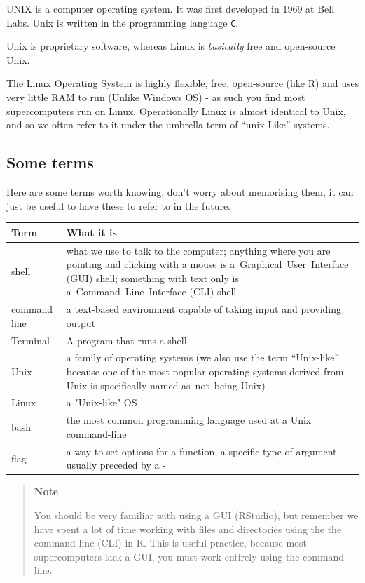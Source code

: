 \documentclass[
]{book}
\begin{document}
UNIX is a computer operating system. It was first developed in 1969 at Bell Labs. Unix is written in the programming language \texttt{C}.

Unix is proprietary software, whereas Linux is \emph{basically} free and open-source Unix.

The Linux Operating System is highly flexible, free, open-source (like R) and uses very little RAM to run (Unlike Windows OS) - as such you find most supercomputers run on Linux. Operationally Linux is almost identical to Unix, and so we often refer to it under the umbrella term of ``unix-Like'' systems.

\hypertarget{some-terms}{%
\subsection{Some terms}\label{some-terms}}

Here are some terms worth knowing, don't worry about memorising them, it can just be useful to have these to refer to in the future.

\begin{longtable}{ll}
\toprule
\textbf{Term} & \textbf{What it is}\\
\midrule
shell & what we use to talk to the computer; anything where you are pointing and clicking with a mouse is a Graphical User Interface (GUI) shell; something with text only is a Command Line Interface (CLI) shell\\
command line & a text-based environment capable of taking input and providing output\\
Terminal & A program that runs a shell\\
Unix & a family of operating systems (we also use the term “Unix-like” because one of the most popular operating systems derived from Unix is specifically named as not being Unix)\\
Linux & a "Unix-like" OS\\
\addlinespace
bash & the most common programming language used at a Unix command-line\\
flag & a way to set options for a function, a specific type of argument usually preceded by a -\\
\bottomrule
\end{longtable}

\begin{quote}
\textbf{Note}

You should be very familiar with using a GUI (RStudio), but remember we have spent a lot of time working with files and directories using the the command line (CLI) in R. This is useful practice, because most supercomputers lack a GUI, you must work entirely using the command line.
\end{quote}
\end{document}

